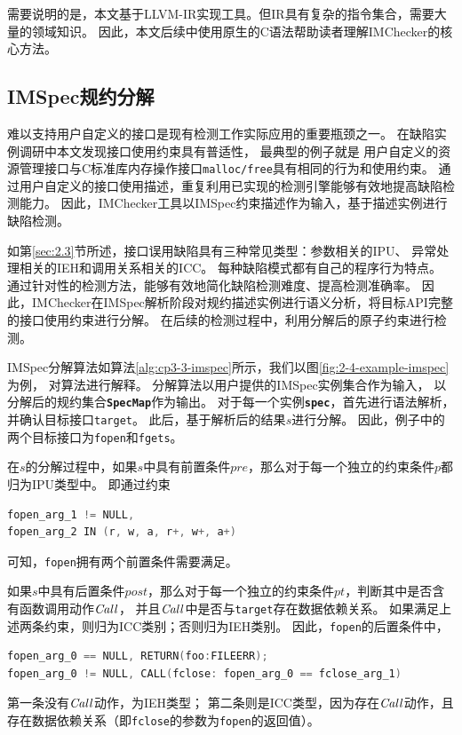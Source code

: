 需要说明的是，本文基于LLVM-IR实现工具。但IR具有复杂的指令集合，需要大量的领域知识。
因此，本文后续中使用原生的C语法帮助读者理解IMChecker的核心方法。

\subsection{IMSpec规约分解}
难以支持用户自定义的接口是现有检测工作实际应用的重要瓶颈之一。
在缺陷实例调研中本文发现接口使用约束具有普适性，
最典型的例子就是
用户自定义的资源管理接口与C标准库内存操作接口\texttt{malloc/free}具有相同的行为和使用约束。
通过用户自定义的接口使用描述，重复利用已实现的检测引擎能够有效地提高缺陷检测能力。
因此，IMChecker工具以IMSpec约束描述作为输入，基于描述实例进行缺陷检测。

如第\ref{sec:2.3}节所述，接口误用缺陷具有三种常见类型：参数相关的IPU、
异常处理相关的IEH和调用关系相关的ICC。
每种缺陷模式都有自己的程序行为特点。
通过针对性的检测方法，能够有效地简化缺陷检测难度、提高检测准确率。
因此，IMChecker在IMSpec解析阶段对规约描述实例进行语义分析，将目标API完整的接口使用约束进行分解。
在后续的检测过程中，利用分解后的原子约束进行检测。



IMSpec分解算法如算法\ref{alg:cp3-3-imspec}所示，我们以图\ref{fig:2-4-example-imspec}为例，
对算法进行解释。
分解算法以用户提供的IMSpec实例集合作为输入，
以分解后的规约集合\textbf{\texttt{SpecMap}}作为输出。
对于每一个实例\textbf{\texttt{spec}}，首先进行语法解析，并确认目标接口\texttt{target}。
此后，基于解析后的结果$s$进行分解。
因此，例子中的两个目标接口为\texttt{fopen}和\texttt{fgets}。

在$s$的分解过程中，如果$s$中具有前置条件$pre$，那么对于每一个独立的约束条件$p$都归为IPU类型中。
即通过约束
\begin{lstlisting}[language={C},
basicstyle=\linespread{0.8}\listingsfont,
numbers=none,
xleftmargin=.25\textwidth]
fopen_arg_1 != NULL,
fopen_arg_2 IN (r, w, a, r+, w+, a+)
\end{lstlisting}
可知，\texttt{fopen}拥有两个前置条件需要满足。

如果$s$中具有后置条件$post$，那么对于每一个独立的约束条件$pt$，判断其中是否含有函数调用动作$\mathit{Call}$，
并且$\mathit{Call}$中是否与\texttt{target}存在数据依赖关系。
如果满足上述两条约束，则归为ICC类别；否则归为IEH类别。
因此，\texttt{fopen}的后置条件中，
\begin{lstlisting}[language={C},
basicstyle=\linespread{0.8}\listingsfont,
numbers=none,
xleftmargin=.15\textwidth]
fopen_arg_0 == NULL, RETURN(foo:FILEERR);
fopen_arg_0 != NULL, CALL(fclose: fopen_arg_0 == fclose_arg_1)
\end{lstlisting}
第一条没有$\mathit{Call}$动作，为IEH类型；
第二条则是ICC类型，因为存在$\mathit{Call}$动作，且存在数据依赖关系（即\texttt{fclose}的参数为\texttt{fopen}的返回值）。

